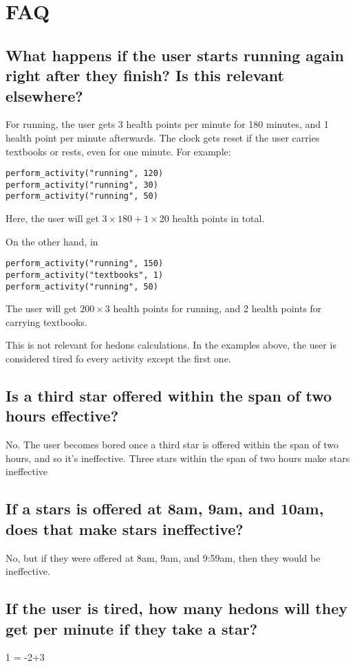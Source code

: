 \documentclass[11pt]{article}
\begin{document}
\section{FAQ}

\subsection{What happens if the user starts running again right after they finish? Is this relevant elsewhere?}

For running, the user gets 3 health points per minute for 180 minutes, and 1 health point per minute afterwards. The clock gets reset if the user carries textbooks or rests, even for one minute. For example:

\begin{verbatim}
perform_activity("running", 120)
perform_activity("running", 30)
perform_activity("running", 50)
\end{verbatim}
Here, the user will get $3\times 180+1\times 20$ health points in total.

On the other hand, in

\begin{verbatim}
perform_activity("running", 150)
perform_activity("textbooks", 1)
perform_activity("running", 50)
\end{verbatim}
The user will get $200\times3$ health points for running, and 2 health points for carrying textbooks.

This is not relevant for hedons calculations. In the examples above, the user is considered tired fo every activity except the first one.


\subsection{Is a third star offered within the span of two hours effective?}
No. The user becomes bored once a third star is offered within the span of two hours, and so it's ineffective. Three stars within the span of two hours make stars ineffective

\subsection{If a stars is offered at 8am, 9am, and 10am, does that make stars ineffective?}
No, but if they were offered at 8am, 9am, and 9:59am, then they would be ineffective.


\subsection{If the user is tired, how many hedons will they get per minute if they take a star?}
1 = -2+3
\end{document}
